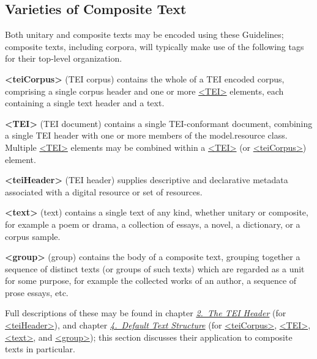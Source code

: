 \subsection[{Varieties of Composite Text}]{Varieties of Composite Text}\label{CCDEF}\par
Both unitary and composite texts may be encoded using these Guidelines; composite texts, including corpora, will typically make use of the following tags for their top-level organization. 
\begin{sansreflist}
  
\item [\textbf{<teiCorpus>}] (TEI corpus) contains the whole of a TEI encoded corpus, comprising a single corpus header and one or more \hyperref[TEI.TEI]{<TEI>} elements, each containing a single text header and a text.
\item [\textbf{<TEI>}] (TEI document) contains a single TEI-conformant document, combining a single TEI header with one or more members of the \textsf{model.resource} class. Multiple \hyperref[TEI.TEI]{<TEI>} elements may be combined within a \hyperref[TEI.TEI]{<TEI>} (or \hyperref[TEI.teiCorpus]{<teiCorpus>}) element.
\item [\textbf{<teiHeader>}] (TEI header) supplies descriptive and declarative metadata associated with a digital resource or set of resources.
\item [\textbf{<text>}] (text) contains a single text of any kind, whether unitary or composite, for example a poem or drama, a collection of essays, a novel, a dictionary, or a corpus sample.
\item [\textbf{<group>}] (group) contains the body of a composite text, grouping together a sequence of distinct texts (or groups of such texts) which are regarded as a unit for some purpose, for example the collected works of an author, a sequence of prose essays, etc.
\end{sansreflist}
 Full descriptions of these may be found in chapter \textit{\hyperref[HD]{2.\ The TEI Header}} (for \hyperref[TEI.teiHeader]{<teiHeader>}), and chapter \textit{\hyperref[DS]{4.\ Default Text Structure}} (for \hyperref[TEI.teiCorpus]{<teiCorpus>}, \hyperref[TEI.TEI]{<TEI>}, \hyperref[TEI.text]{<text>}, and \hyperref[TEI.group]{<group>}); this section discusses their application to composite texts in particular.\par
